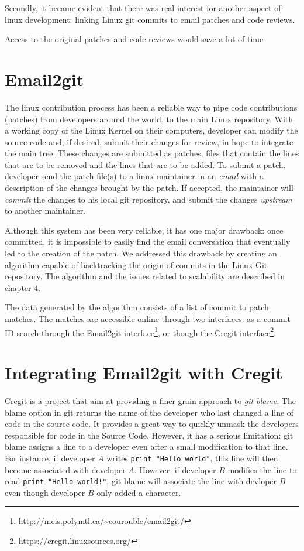 Secondly, it became evident that there was real interest for another aspect of linux development: linking Linux git commits to email patches and code reviews. 


 Access to the original patches and code reviews would save a lot of time 


\section{Email2git}
\label{sec:email2git}

The linux contribution process has been a reliable way to pipe code contributions (patches) from developers around the world, to the main Linux repository. With a working copy of the Linux Kernel on their computers, developer can modify the source code and, if desired, submit their changes for review, in hope to integrate the main tree. These changes are submitted as patches, files that contain the lines that are to be removed and the lines that are to be added. To submit a patch, developer send the patch file(s) to a linux maintainer in an \textit{email} with a description of the changes brought by the patch. If accepted, the maintainer will \textit{commit} the changes to his local git repository, and submit the changes \textit{upstream} to another maintainer. 

Although this system has been very reliable, it has one major drawback: once committed, it is impossible to easily find the email conversation that eventually led to the creation of the patch. We addressed this drawback by creating an algorithm capable of backtracking the origin of commits in the Linux Git repository. The algorithm and the issues related to scalability are described in chapter 4.

The data generated by the algorithm consists of a list of commit to patch matches. The matches are accessible online through two interfaces: as a commit ID search through the Email2git interface\footnote{\url{http://mcis.polymtl.ca/~courouble/email2git/}}, or though the Cregit interface\footnote{\url{https://cregit.linuxsources.org/}}.






\section{Integrating Email2git with Cregit}

Cregit is a project that aim at providing a finer grain approach to \textit{git blame}. The blame option in git returns the name of the developer who last changed a line of code in the source code. It provides a great way to quickly unmask the developers responsible for code in the Source Code. However, it has a serious limitation: git blame assigns a line to a developer even after a small modification to that line. For instance, if developer $A$ writes \texttt{print "Hello world"}, this line will then become associated with developer $A$. However, if developer $B$ modifies the line to read \texttt{print "Hello world!"}, git blame will associate the line with devloper $B$ even though developer $B$ only added a character. 


